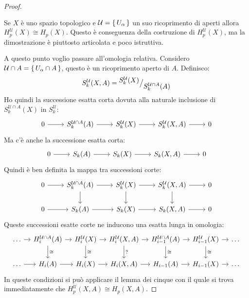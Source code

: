 \begin{proof}
  \begin{osservation}
    Se $ X $ è uno spazio topologico e $ \mathcal{U} = \set{U_\alpha} $ un suo
    ricoprimento di aperti allora $ H_p^\mathcal{U}(X) \cong H_p(X) $. Questo è
    conseguenza della costruzione di $ H^\mathcal{U}_p(X) $, ma la dimostrazione
    è piuttosto articolata e poco istruttiva.
  \end{osservation}
  A questo punto voglio passare all'omologia relativa. Considero $ \mathcal{U} \cap A = \set{U_\alpha \cap A} $,
  questo è un ricoprimento aperto di $ A $. Definisco:
  \[
    S_k^\mathcal{U}(X,A) = {^{\textstyle S_k^\mathcal{U}(X)}\big/_{\textstyle S_k^{\mathcal{U} \cap A}(A)}}
  \]
  Ho quindi la successione esatta corta dovuta alla naturale inclusione
  di $ S_k^{\mathcal{U} \cap A}(X) $ in $ S_k^{\mathcal{U}} $:
  \[
    \begin{tikzcd}
      0 \rar & S_k^{\mathcal{U} \cap A}(A) \rar & S_k^{\mathcal{U}}(X) \rar & S_k^{\mathcal{U}}(X,A) \rar & 0
    \end{tikzcd}
  \]
  Ma c'è anche la successione esatta corta:
  \[
    \begin{tikzcd}
      0 \rar & S_k(A) \rar & S_k(X) \rar & S_k(X,A) \rar & 0
    \end{tikzcd}
  \]
  Quindi è ben definita la mappa tra successioni corte:
  \[
    \begin{tikzcd}
      0 \rar & S_k^{\mathcal{U} \cap A}(A) \rar \dar & S_k^{\mathcal{U}}(X) \rar \dar & S_k^{\mathcal{U}}(X,A) \rar \dar & 0 \\
      0 \rar & S_k(A) \rar & S_k(X) \rar & S_k(X,A) \rar & 0
    \end{tikzcd}
  \]
  Queste successioni esatte corte ne inducono una esatta lunga in omologia:
  \[
    \begin{tikzcd}[nodes={column sep = 10 pt}]
      \dots \rar & H_i^{\mathcal{U} \cap A}(A) \rar \dar{\cong} & H_i^{\mathcal{U}}(X) \rar \dar{\cong} & H_i^{\mathcal{U}}(X,A) \rar \dar{?} &  H_{i-1}^{\mathcal{U} \cap A}(A) \rar
      \dar{\cong} & H_{i-1}^{\mathcal{U}}(X) \rar \dar{\cong} & \dots \\
      \dots \rar & H_i(A) \rar & H_i(X) \rar & H_i(X,A) \rar &  H_{i-1}(A) \rar & H_{i-1}(X) \rar & \dots
    \end{tikzcd}
  \]
  In queste condizioni si può applicare il lemma dei cinque con il quale si trova immediatamente
  che  $ H_p^\mathcal{U}(X, A) \cong H_p(X,A) $.


\end{proof}
